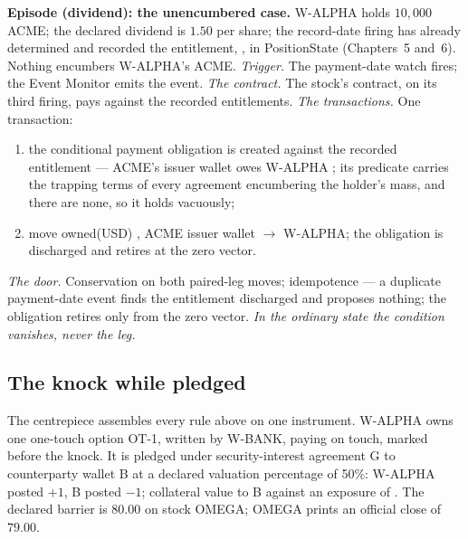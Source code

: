 \medskip\noindent\textbf{Episode (dividend): the unencumbered case.}
W-ALPHA holds $10{,}000$ ACME; the declared dividend is $1.50$ per share; the
record-date firing has already determined and recorded the entitlement,
, in PositionState (Chapters~5 and~6). Nothing encumbers
W-ALPHA's ACME.
\emph{Trigger.} The payment-date watch fires; the Event Monitor emits the
event.
\emph{The contract.} The stock's contract, on its third firing, pays against
the recorded entitlements.
\emph{The transactions.} One transaction:
\begin{enumerate}[label=(\arabic*),nosep]
\item the conditional payment obligation is created against the recorded
entitlement --- ACME's issuer wallet owes W-ALPHA ; its predicate
carries the trapping terms of every agreement encumbering the holder's mass,
and there are none, so it holds vacuously;
\item move owned(USD) , ACME issuer wallet $\to$ W-ALPHA; the
obligation is discharged and retires at the zero vector.
\end{enumerate}
\emph{The door.} Conservation on both paired-leg moves; idempotence --- a
duplicate payment-date event finds the entitlement discharged and proposes
nothing; the obligation retires only from the zero vector.
\emph{In the ordinary state the condition vanishes, never the leg.}

\subsection{The knock while pledged}

The centrepiece assembles every rule above on one instrument. W-ALPHA owns one
one-touch option OT-1, written by W-BANK, paying  on touch,
marked  before the knock. It is pledged under security-interest
agreement G to counterparty wallet B at a declared valuation percentage of
50\%: W-ALPHA posted $+1$, B posted $-1$; collateral value to B
 against an exposure of . The declared barrier is
$80.00$ on stock OMEGA; OMEGA prints an official close of $79.00$.

